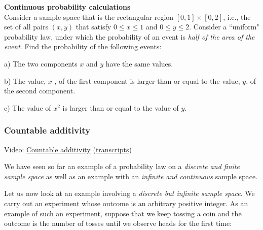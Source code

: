 \documentclass[pdftex, brazil, 12pt, twoside]{article}
\begin{document}
\begin{exercise}
  \textbf{Continuous probability calculations}\\
  Consider a sample space that is the rectangular region $[0, 1] \times [0, 2]$,
  i.e., the set of all pairs $(x, y)$ that satisfy $0 \le x \le 1$ and $0 \le y \le 2$.
  Consider a “uniform" probability law, under which the probability of an event is
  \emph{half of the area of the event}. Find the probability of the following events:

  a) The two components $x$ and $y$ have the same values.
  
  b) The value, $x$ , of the first component is larger than or equal to the value, $y$,
  of the second component.

  c) The value of $x^2$ is larger than or equal to the value of $y$.
\end{exercise}

\subsubsection{Countable additivity}
\label{un1-lec1-coutable-additivity}

Video: \href{https://www.youtube.com/watch?v=oGePTQ6hFFI}{Countable additivity}
(\href{Unit-1/01\_lecture\_1\_probability\_models\_and\_axioms/l01\_8\_transcripts.pdf}{transcripts})

We have seen so far an example of a probability law on a
\emph{discrete and finite sample space} as well as an example
with an \emph{infinite and continuous} sample space.

Let us now look at an example involving a \emph{discrete but
infinite sample space}.
We carry out an experiment whose outcome is an arbitrary
positive integer.
As an example of such an experiment, suppose that we
keep tossing a coin and the outcome is the number of
tosses until we observe heads for the first time:

\begin{figure}[H]
  \begin{center}
  \end{center}
\end{figure}
\end{document}

